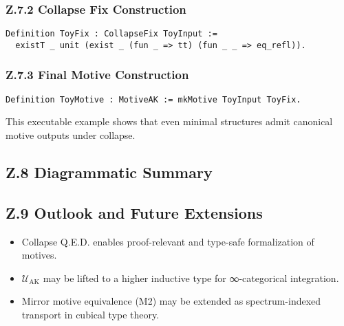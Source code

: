 \documentclass[11pt]{article}
\begin{document}
\subsubsection*{Z.7.2 Collapse Fix Construction}

\begin{lstlisting}[language=Coq, caption=Toy Collapse Fix Definition]
Definition ToyFix : CollapseFix ToyInput :=
  existT _ unit (exist _ (fun _ => tt) (fun _ _ => eq_refl)).
\end{lstlisting}

\subsubsection*{Z.7.3 Final Motive Construction}

\begin{lstlisting}[language=Coq, caption=Toy Motive Construction]
Definition ToyMotive : MotiveAK := mkMotive ToyInput ToyFix.
\end{lstlisting}

This executable example shows that even minimal structures admit canonical motive outputs under collapse.

\subsection*{Z.8 Diagrammatic Summary}

\begin{center}
\end{center}

\subsection*{Z.9 Outlook and Future Extensions}

\begin{itemize}
  \item Collapse Q.E.D. enables proof-relevant and type-safe formalization of motives.
  \item $\mathcal{U}_{\mathrm{AK}}$ may be lifted to a higher inductive type for ∞-categorical integration.
  \item Mirror motive equivalence (M2) may be extended as spectrum-indexed transport in cubical type theory.
\end{itemize}
\end{document}

